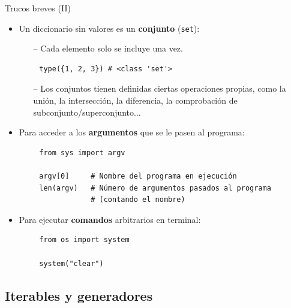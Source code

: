 \documentclass[10pt]{beamer} %
\begin{document}
\begin{frame}[fragile]{Trucos breves (II)}
    \begin{itemize}
        \item Un diccionario sin valores es un \textbf{conjunto} (\texttt{set}):
        \begin{itemize}
            \item[--] Cada elemento solo se incluye una vez.
        \end{itemize}
    \end{itemize}
    \begin{verbatim}
        type({1, 2, 3}) # <class 'set'>
    \end{verbatim}
    \begin{itemize}
        \item[]
        \begin{itemize}
            \item[--] Los conjuntos tienen definidas ciertas operaciones propias, como la unión, la intersección, la diferencia, la comprobación de subconjunto/superconjunto...
        \end{itemize}
        \item Para acceder a los \textbf{argumentos} que se le pasen al programa:
    \end{itemize}
    \begin{verbatim}
        from sys import argv
        
        argv[0]     # Nombre del programa en ejecución
        len(argv)   # Número de argumentos pasados al programa
                    # (contando el nombre)
    \end{verbatim}
    \begin{itemize}
        \item Para ejecutar \textbf{comandos} arbitrarios en terminal:
    \end{itemize}
    \begin{verbatim}
        from os import system
        
        system("clear")
    \end{verbatim}
\end{frame}

\subsection{Iterables y generadores}
\end{document}
